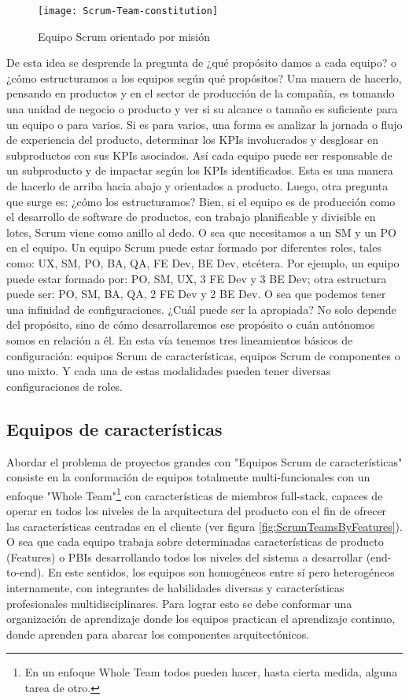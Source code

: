 \begin{figure}[h]
  \centering
  \texttt{[image: Scrum-Team-constitution]}
  \caption{Equipo Scrum orientado por misión}
  \centering
  \label{fig:Scrum-Team-constitution} %
\end{figure}

De esta idea se desprende la pregunta de ¿qué propósito damos a cada equipo? o ¿cómo estructuramos a los equipos según qué propósitos? Una manera de hacerlo, pensando en productos y en el sector de producción de la compañía, es tomando una unidad de negocio o producto y ver si su alcance o tamaño es suficiente para un equipo o para varios. Si es para varios, una forma es analizar la jornada o flujo de experiencia del producto, determinar los KPIs involucrados y desglosar en subproductos con sus KPIs asociados. Así cada equipo puede ser responsable de un subproducto y de impactar según los KPIs identificados. Esta es una manera de hacerlo de arriba hacia abajo y orientados a producto. Luego, otra pregunta que surge es: ¿cómo los estructuramos? Bien, si el equipo es de producción como el desarrollo de software de productos, con trabajo planificable y divisible en lotes, Scrum viene como anillo al dedo. O sea que necesitamos a un SM y un PO en el equipo. Un equipo Scrum puede estar formado por diferentes roles, tales como: UX, SM, PO, BA, QA, FE Dev, BE Dev, etcétera. Por ejemplo, un equipo puede estar formado por: PO, SM, UX, 3 FE Dev y 3 BE Dev; otra estructura puede ser: PO, SM, BA, QA, 2 FE Dev y 2 BE Dev. O sea que podemos tener una infinidad de configuraciones. ¿Cuál puede ser la apropiada? No solo depende del propósito, sino de cómo desarrollaremos ese propósito o cuán autónomos somos en relación a él. En esta vía tenemos tres lineamientos básicos de configuración: equipos Scrum de características, equipos Scrum de componentes o uno mixto. Y cada una de estas modalidades pueden tener diversas configuraciones de roles.

\subsection{Equipos de características}

Abordar el problema de proyectos grandes con "Equipos Scrum de características" consiste en la conformación de equipos totalmente multi-funcionales con un enfoque "Whole Team"\footnote{En un enfoque Whole Team todos pueden hacer, hasta cierta medida, alguna tarea de otro\cite{Juan-Gabardini-2015}.} con características de miembros full-stack, capaces de operar en todos los niveles de la arquitectura del producto con el fin de ofrecer las características centradas en el cliente (ver figura \ref{fig:ScrumTeamsByFeatures}). O sea que cada equipo trabaja sobre determinadas características de producto (Features) o PBIs desarrollando todos los niveles del sistema a desarrollar (end-to-end). En este sentidos, los equipos son homogéneos entre sí pero heterogéneos internamente, con integrantes de habilidades diversas y características profesionales multidisciplinares. Para lograr esto se debe conformar una organización de aprendizaje donde los equipos practican el aprendizaje continuo, donde aprenden para abarcar los componentes arquitectónicos.

